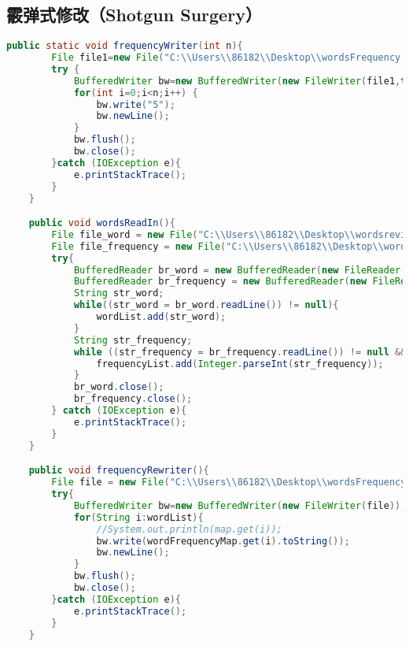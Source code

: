 \documentclass[a4paper]{article}
\begin{document}
\subsection{霰弹式修改（Shotgun Surgery）}
\begin{lstlisting}[language={java}]
    public static void frequencyWriter(int n){
        File file1=new File("C:\\Users\\86182\\Desktop\\wordsFrequency.txt");
        try {
            BufferedWriter bw=new BufferedWriter(new FileWriter(file1,true));
            for(int i=0;i<n;i++) {
                bw.write("5");
                bw.newLine();
            }
            bw.flush();
            bw.close();
        }catch (IOException e){
            e.printStackTrace();
        }
    }

    public void wordsReadIn(){
        File file_word = new File("C:\\Users\\86182\\Desktop\\wordsreview.txt");
        File file_frequency = new File("C:\\Users\\86182\\Desktop\\wordsFrequency.txt");
        try{
            BufferedReader br_word = new BufferedReader(new FileReader(file_word));
            BufferedReader br_frequency = new BufferedReader(new FileReader(file_frequency));
            String str_word;
            while((str_word = br_word.readLine()) != null){
                wordList.add(str_word);
            }
            String str_frequency;
            while ((str_frequency = br_frequency.readLine()) != null && !str_frequency.equals("")){
                frequencyList.add(Integer.parseInt(str_frequency));
            }
            br_word.close();
            br_frequency.close();
        } catch (IOException e){
            e.printStackTrace();
        }
    }

    public void frequencyRewriter(){
        File file = new File("C:\\Users\\86182\\Desktop\\wordsFrequency.txt");
        try{
            BufferedWriter bw=new BufferedWriter(new FileWriter(file));
            for(String i:wordList){
                //System.out.println(map.get(i));
                bw.write(wordFrequencyMap.get(i).toString());
                bw.newLine();
            }
            bw.flush();
            bw.close();
        }catch (IOException e){
            e.printStackTrace();
        }
    }
\end{lstlisting}
\end{document}
